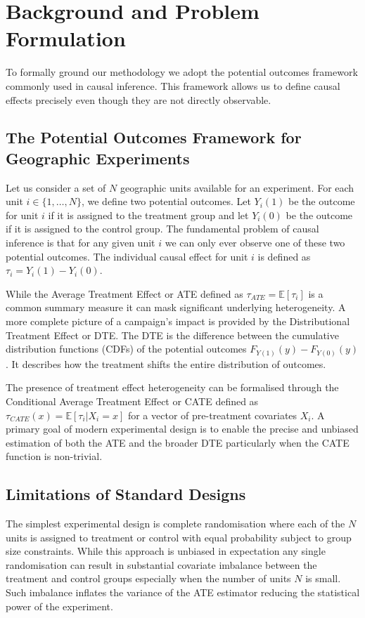 \documentclass[final,3p,fleqn, 10pt]{elsarticle}
\begin{document}
\section{Background and Problem Formulation}
\label{sec:background}
To formally ground our methodology we adopt the potential outcomes framework commonly used in causal inference. This framework allows us to define causal effects precisely even though they are not directly observable.

    \subsection{The Potential Outcomes Framework for Geographic Experiments}
    Let us consider a set of $N$ geographic units available for an experiment. For each unit $i \in \{1, \dots, N\}$, we define two potential outcomes. Let $Y_i(1)$ be the outcome for unit $i$ if it is assigned to the treatment group and let $Y_i(0)$ be the outcome if it is assigned to the control group. The fundamental problem of causal inference is that for any given unit $i$ we can only ever observe one of these two potential outcomes. The individual causal effect for unit $i$ is defined as $\tau_i = Y_i(1) - Y_i(0)$.

    While the Average Treatment Effect or ATE defined as $\tau_{ATE} = \mathbb{E}[\tau_i]$ is a common summary measure it can mask significant underlying heterogeneity. A more complete picture of a campaign's impact is provided by the Distributional Treatment Effect or DTE. The DTE is the difference between the cumulative distribution functions (CDFs) of the potential outcomes $F_{Y(1)}(y) - F_{Y(0)}(y)$. It describes how the treatment shifts the entire distribution of outcomes.

    The presence of treatment effect heterogeneity can be formalised through the Conditional Average Treatment Effect or CATE defined as $\tau_{CATE}(x) = \mathbb{E}[\tau_i | X_i = x]$ for a vector of pre-treatment covariates $X_i$. A primary goal of modern experimental design is to enable the precise and unbiased estimation of both the ATE and the broader DTE particularly when the CATE function is non-trivial.

    \subsection{Limitations of Standard Designs}
    The simplest experimental design is complete randomisation where each of the $N$ units is assigned to treatment or control with equal probability subject to group size constraints. While this approach is unbiased in expectation any single randomisation can result in substantial covariate imbalance between the treatment and control groups especially when the number of units $N$ is small. Such imbalance inflates the variance of the ATE estimator reducing the statistical power of the experiment.
\end{document}
